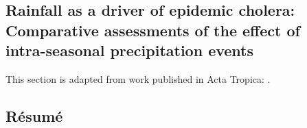 \begin{fullwidth}
\chapter[Rainfall as a driver of epidemic cholera: Comparative assessments of the effect of intra-seasonal precipitation events]{Rainfall as a driver of epidemic cholera:\\Comparative assessments of the effect of\\intra-seasonal precipitation events}\label{ch:cholera-rainfall}
This section is adapted from work published in Acta Tropica:
.%


\section{Résumé}


\end{fullwidth}
